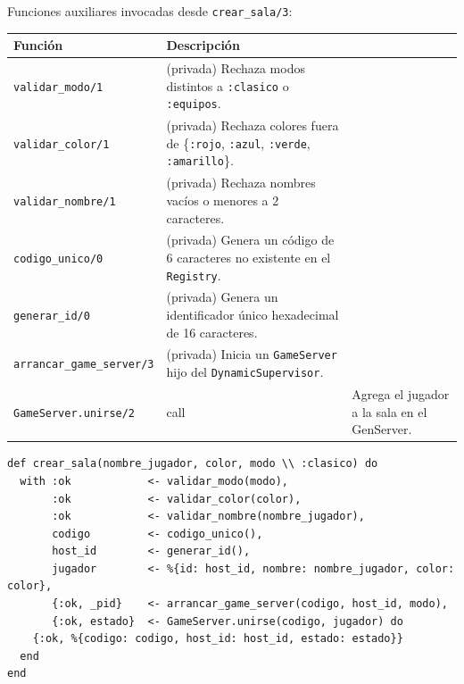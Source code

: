 \documentclass[11pt,a4paper]{article}
\begin{document}
Funciones auxiliares invocadas desde \texttt{crear\_sala/3}:

\begin{center}
\renewcommand{\arraystretch}{1.3}
\begin{tabularx}{\linewidth}{l X}
\toprule
\textbf{Función} & \textbf{Descripción} \\
\midrule
\texttt{validar\_modo/1}    & (privada) Rechaza modos distintos a \texttt{:clasico} o \texttt{:equipos}. \\
\texttt{validar\_color/1}   & (privada) Rechaza colores fuera de \{\texttt{:rojo}, \texttt{:azul}, \texttt{:verde}, \texttt{:amarillo}\}. \\
\texttt{validar\_nombre/1}  & (privada) Rechaza nombres vacíos o menores a 2 caracteres. \\
\texttt{codigo\_unico/0}    & (privada) Genera un código de 6 caracteres no existente en el \texttt{Registry}. \\
\texttt{generar\_id/0}      & (privada) Genera un identificador único hexadecimal de 16 caracteres. \\
\texttt{arrancar\_game\_server/3} & (privada) Inicia un \texttt{GameServer} hijo del \texttt{DynamicSupervisor}. \\
\texttt{GameServer.unirse/2} & call & Agrega el jugador a la sala en el GenServer. \\
\bottomrule
\end{tabularx}
\end{center}

\begin{lstlisting}[caption={Pipeline de creación de sala con \texttt{with/1}}]
def crear_sala(nombre_jugador, color, modo \\ :clasico) do
  with :ok            <- validar_modo(modo),
       :ok            <- validar_color(color),
       :ok            <- validar_nombre(nombre_jugador),
       codigo         <- codigo_unico(),
       host_id        <- generar_id(),
       jugador        <- %{id: host_id, nombre: nombre_jugador, color: color},
       {:ok, _pid}    <- arrancar_game_server(codigo, host_id, modo),
       {:ok, estado}  <- GameServer.unirse(codigo, jugador) do
    {:ok, %{codigo: codigo, host_id: host_id, estado: estado}}
  end
end
\end{lstlisting}
\end{document}
